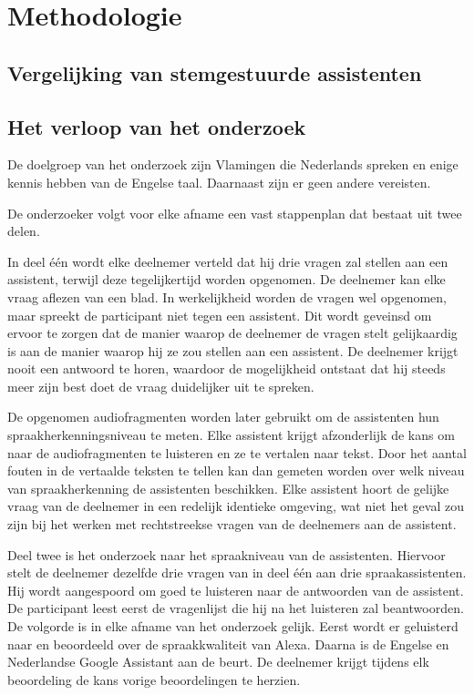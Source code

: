 
\chapter{Methodologie}
\label{ch:methodologie}

\section{Vergelijking van stemgestuurde assistenten}
\label{sec:vergelijking van stemgestuurde assistenten}

\section{Het verloop van het onderzoek}
De doelgroep van het onderzoek zijn Vlamingen die Nederlands spreken en enige kennis hebben van de Engelse taal. Daarnaast zijn er geen andere vereisten.

De onderzoeker volgt voor elke afname een vast stappenplan dat bestaat uit twee delen.

In deel één wordt elke deelnemer verteld dat hij drie vragen zal stellen aan een assistent, terwijl deze tegelijkertijd worden opgenomen. De deelnemer kan elke vraag aflezen van een blad. In werkelijkheid worden de vragen wel opgenomen, maar spreekt de participant niet tegen een assistent. Dit wordt geveinsd om ervoor te zorgen dat de manier waarop de deelnemer de vragen stelt gelijkaardig is aan de manier waarop hij ze zou stellen aan een assistent. De deelnemer krijgt nooit een antwoord te horen, waardoor de mogelijkheid ontstaat dat hij steeds meer zijn best doet de vraag duidelijker uit te spreken.

De opgenomen audiofragmenten worden later gebruikt om de assistenten hun spraakherkenningsniveau te meten. Elke assistent krijgt afzonderlijk de kans om naar de audiofragmenten te luisteren en ze te vertalen naar tekst. Door het aantal fouten in de vertaalde teksten te tellen kan dan gemeten worden over welk niveau van spraakherkenning de assistenten beschikken. Elke assistent hoort de gelijke vraag van de deelnemer in een redelijk identieke omgeving, wat niet het geval zou zijn bij het werken met rechtstreekse vragen van de deelnemers aan de assistent. 

Deel twee is het onderzoek naar het spraakniveau van de assistenten. Hiervoor stelt de deelnemer dezelfde drie vragen van in deel één aan drie spraakassistenten. Hij wordt aangespoord om goed te luisteren naar de antwoorden van de assistent. De participant leest eerst de vragenlijst die hij na het luisteren zal beantwoorden. De volgorde is in elke afname van het onderzoek gelijk. Eerst wordt er geluisterd naar en beoordeeld over de spraakkwaliteit van Alexa. Daarna is de Engelse en Nederlandse Google Assistant aan de beurt. De deelnemer krijgt tijdens elk beoordeling de kans vorige beoordelingen te herzien.

